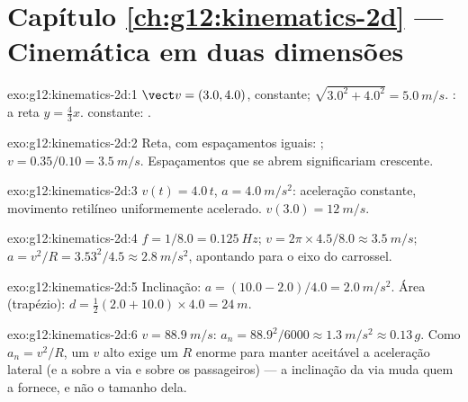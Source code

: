 \section*{Capítulo \ref{ch:g12:kinematics-2d} --- Cinemática em duas dimensões}

\begin{solution}{exo:g12:kinematics-2d:1}
$\vect v = (3.0, 4.0)$, constante; 
$\sqrt{3.0^2 + 4.0^2} = \qty{5.0}{m/s}$. : a reta
$y = \tfrac43 x$.  constante: .
\end{solution}

\begin{solution}{exo:g12:kinematics-2d:2}
Reta, com espaçamentos iguais: ;
$v = 0.35/0.10 = \qty{3.5}{m/s}$. Espaçamentos que se abrem
significariam  crescente.
\end{solution}

\begin{solution}{exo:g12:kinematics-2d:3}
$v(t) = 4.0\,t$, $a = \qty{4.0}{m/s^2}$: aceleração constante, movimento
retilíneo uniformemente acelerado. $v(3.0) = \qty{12}{m/s}$.
\end{solution}

\begin{solution}{exo:g12:kinematics-2d:4}
$f = 1/8.0 = \qty{0.125}{Hz}$;
$v = 2\pi \times 4.5/8.0 \approx \qty{3.5}{m/s}$;
$a = v^2/R = 3.53^2/4.5 \approx \qty{2.8}{m/s^2}$, apontando para o eixo
do carrossel.
\end{solution}

\begin{solution}{exo:g12:kinematics-2d:5}
Inclinação: $a = (10.0 - 2.0)/4.0 = \qty{2.0}{m/s^2}$. Área (trapézio):
$d = \tfrac12 (2.0 + 10.0) \times 4.0 = \qty{24}{m}$.
\end{solution}

\begin{solution}{exo:g12:kinematics-2d:6}
$v = \qty{88.9}{m/s}$: $a_n = 88.9^2/6000 \approx \qty{1.3}{m/s^2}
\approx 0.13\,g$. Como $a_n = v^2/R$, um $v$ alto exige um $R$ enorme
para manter aceitável a aceleração lateral (e a  sobre a via e sobre
os passageiros) --- a inclinação da via muda quem a fornece, e não o
tamanho dela.
\end{solution}

